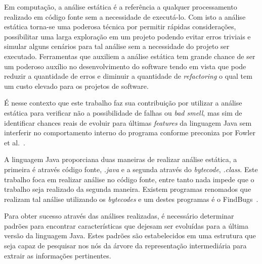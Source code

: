 Em computa\c{c}\~{a}o, a an\'{a}lise est\'{a}tica \'{e} a refer\^{e}ncia a qualquer processamento realizado em c\'{o}digo fonte sem a necessidade de execut\'{a}-lo. Com isto a an\'{a}lise est\'{a}tica torna-se uma poderosa t\'{e}cnica por permitir r\'{a}pidas considera\c{c}\~{o}es, possibilitar uma larga explora\c{c}\~{a}o em um projeto podendo evitar erros triviais e simular alguns cen\'{a}rios para tal an\'{a}lise sem a necessidade do projeto ser executado. Ferramentas que auxiliem a an\'{a}lise est\'{a}tica tem grande chance de ser um poderoso aux\'{i}lio no desenvolvimento do software tendo em vista que pode reduzir a quantidade de erros e diminuir a quantidade de \textit{refactoring} o qual tem um custo elevado para os projetos de software.

\'{E} nesse contexto que este trabalho faz sua contribui\c{c}\~{a}o por utilizar a an\'{a}lise est\'{a}tica para verificar n\~{a}o a possibilidade de falhas ou \textit{bad smell}, mas sim de identificar chances reais de evoluir para \'{u}ltimas \textit{features} da linguagem Java sem interferir no comportamento interno do programa conforme preconiza por Fowler et al.~\cite{martinFowlerRafactoring}.

A linguagem Java proporciana duas maneiras de realizar an\'{a}lise est\'{a}tica, a primeira \'{e} através c\'{o}digo fonte, \textit{.java} e a segunda atrav\'{e}s do \textit{bytecode}, \textit{.class}. Este trabalho foca em realizar an\'{a}lise no c\'{o}digo fonte, entre tanto nada impede que o trabalho seja realizado da segunda maneira. Existem programas renomados que realizam tal an\'{a}lise utilizando os \textit{bytecodes} e um destes programas \'{e} o FindBugs~\cite{FindBugs}.


Para obter sucesso atrav\'{e}s das an\'{a}lises realizadas, \'{e} necess\'{a}rio determinar padr\~{o}es para encontrar caracter\'{i}sticas que dejesam ser evolu\'{i}das para a \'{u}ltima vers\~{a}o da linguagem Java. Estes padr\~{o}es s\~{a}o estabelecidos em uma estrutura que seja capaz de pesquisar nos n\'{o}s da \'{a}rvore da representa\c{c}\~{a}o intermedi\'{a}ria para extrair as informa\c{c}\~{o}es pertinentes.

